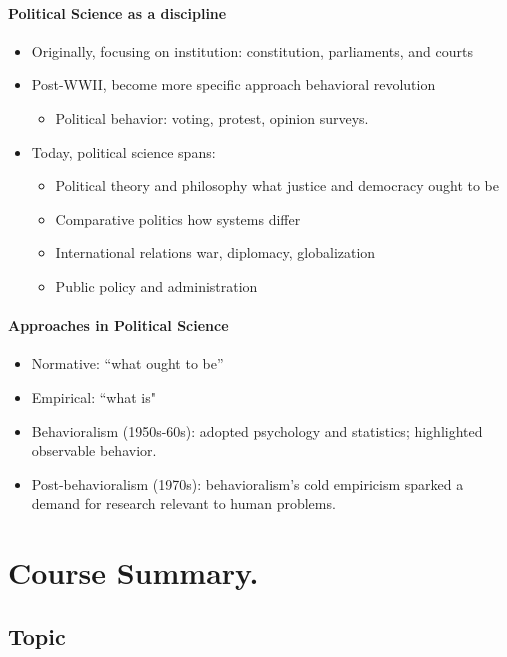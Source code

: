 \documentclass[11pt]{book}
\begin{document}
			\subsection{Political Science as a discipline}
			\begin{itemize}
				\item Originally, focusing on institution: constitution, parliaments, and courts
				\item Post-WWII, become more specific approach \textemdash \space behavioral revolution
					\begin{itemize}
						\item Political behavior: voting, protest, opinion surveys. 
					\end{itemize}
				\end{itemize}
			\begin{itemize}
				\item Today, political science spans:
				\begin{itemize} 
				\item Political theory and philosophy \textemdash what justice and democracy ought to be
				\item Comparative politics \textemdash how systems differ
				\item International relations \textemdash war, diplomacy, globalization
				\item Public policy and administration
				\end{itemize}
			\end{itemize}
			
		\subsection{Approaches in Political Science}
		\begin{itemize}
			\item Normative: ``what ought to be\textquotedblright
			\item Empirical: ``what is"
			\item Behavioralism (1950s-60s): adopted psychology and statistics; highlighted observable behavior.
			\item Post-behavioralism (1970s): behavioralism’s cold empiricism sparked a demand for research relevant to human problems.
		
		\end{itemize}
		
		
		
		
						
\part{Course Summary.}
	\chapter{Topic}
\end{document}
